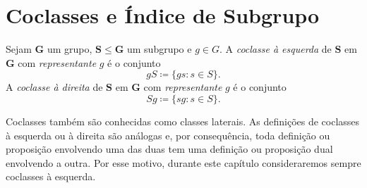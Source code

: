 \section{Coclasses e Índice de Subgrupo}

\begin{defi}
Sejam $\bm G$ um grupo, $\bm S \leq \bm G$ um subgrupo e $g \in G$. A \emph{coclasse à esquerda} de $\bm S$ em $\bm G$ com \emph{representante} $g$ é o conjunto
	\begin{equation*}
	gS \coloneqq \{gs:s \in S\}.
	\end{equation*}
A \emph{coclasse à direita} de $\bm S$ em $\bm G$ com \emph{representante} $g$ é o conjunto
	\begin{equation*}
	Sg \coloneqq \{sg:s \in S\}.
	\end{equation*}
\end{defi}

Coclasses também são conhecidas como classes laterais. As definições de coclasses à esquerda ou à direita são análogas e, por consequência, toda definição ou proposição envolvendo uma das duas tem uma definição ou proposição dual envolvendo a outra. Por esse motivo, durante este capítulo consideraremos sempre coclasses à esquerda.

